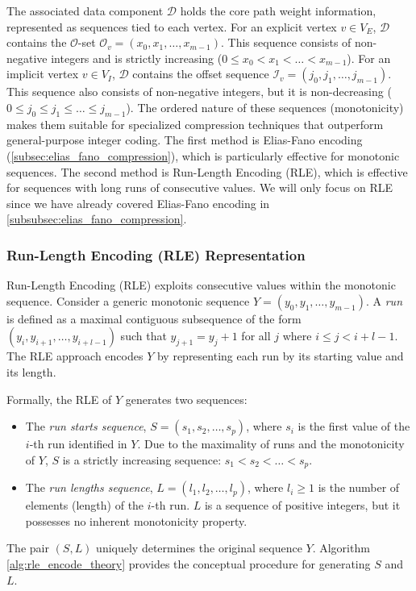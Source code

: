 The associated data component $\mathcal{D}$ holds the core path weight information, represented as sequences tied to each vertex. For an explicit vertex $v \in V_E$, $\mathcal{D}$ contains the $\mathcal{O}$-set $\mathcal{O}_v = (x_0, x_1, \dots, x_{m-1})$. This sequence consists of non-negative integers and is strictly increasing ($0 \le x_0 < x_1 < \dots < x_{m-1}$). For an implicit vertex $v \in V_I$, $\mathcal{D}$ contains the offset sequence $\mathcal{I}_v = (j_0, j_1, \dots, j_{m-1})$. This sequence also consists of non-negative integers, but it is non-decreasing ($0 \le j_0 \le j_1 \le \dots \le j_{m-1}$). The ordered nature of these sequences (monotonicity) makes them suitable for specialized compression techniques that outperform general-purpose integer coding. The first method
is Elias-Fano encoding (\autoref{subsec:elias_fano_compression}), which is particularly effective for monotonic sequences. The second method is Run-Length Encoding (RLE), which is effective for sequences with long runs of consecutive values. We will only focus on RLE since we have already covered Elias-Fano encoding in \autoref{subsubsec:elias_fano_compression}.
\subsubsection*{Run-Length Encoding (RLE) Representation}

Run-Length Encoding (RLE) exploits consecutive values within the monotonic sequence. Consider a generic monotonic sequence $Y = (y_0, y_1, \dots, y_{m-1})$. A \emph{run} is defined as a maximal contiguous subsequence of the form $(y_i, y_{i+1}, \dots, y_{i+l-1})$ such that $y_{j+1} = y_j + 1$ for all $j$ where $i \le j < i+l-1$. The RLE approach encodes $Y$ by representing each run by its starting value and its length.

Formally, the RLE of $Y$ generates two sequences:
\begin{itemize}
    \item The \emph{run starts sequence}, $S = (s_1, s_2, \dots, s_p)$, where $s_i$ is the first value of the $i$-th run identified in $Y$. Due to the maximality of runs and the monotonicity of $Y$, $S$ is a strictly increasing sequence: $s_1 < s_2 < \dots < s_p$.
    \item The \emph{run lengths sequence}, $L = (l_1, l_2, \dots, l_p)$, where $l_i \ge 1$ is the number of elements (length) of the $i$-th run. $L$ is a sequence of positive integers, but it possesses no inherent monotonicity property.
\end{itemize}
The pair $(S, L)$ uniquely determines the original sequence $Y$. Algorithm \ref{alg:rle_encode_theory} provides the conceptual procedure for generating $S$ and $L$.

